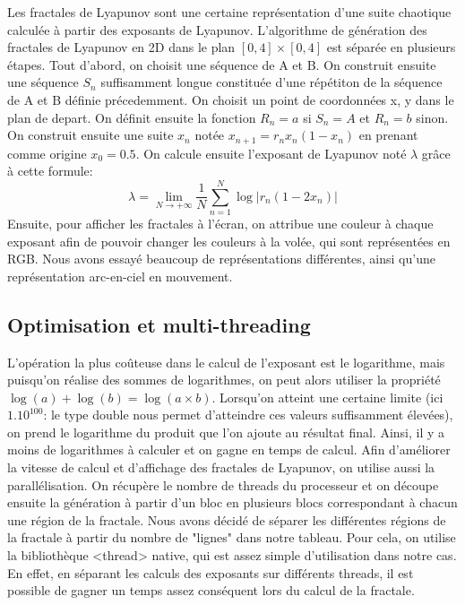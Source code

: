 \documentclass{article}
\begin{document}
	Les fractales de Lyapunov sont une certaine représentation d'une suite chaotique calculée à partir des exposants de Lyapunov.
	L'algorithme de génération des fractales de Lyapunov en 2D dans le plan $[0,4] \times [0,4]$ est séparée en plusieurs étapes.
	Tout d'abord, on choisit une séquence de A et B.
	On construit ensuite une séquence $S_n$ suffisamment longue constituée d'une répétiton de la séquence de A et B définie précedemment.
	On choisit un point de coordonnées x, y dans le plan de depart.
	On définit ensuite la fonction $R_n = a$ si $ S_n = A $ et $R_n = b$ sinon.
	On construit ensuite une suite $x_n$ notée $x_{{n+1}}=r_{n}x_{n}(1-x_{n})$ en prenant comme origine $x_0 = 0.5$.
	On calcule ensuite l'exposant de Lyapunov noté $\lambda$ grâce à cette formule:
	\[\lambda = \lim_{N \to +\infty} \frac{1}{N} \sum_{n=1}^{N} \log | r_n(1-2x_n) |\]
	Ensuite, pour afficher les fractales à l'écran, on attribue une couleur à chaque exposant afin de pouvoir changer les couleurs à la volée, qui sont représentées en RGB.
	Nous avons essayé beaucoup de représentations différentes, ainsi qu'une représentation arc-en-ciel en mouvement.

	\subsection{Optimisation et multi-threading}

	L'opération la plus coûteuse dans le calcul de l'exposant est le logarithme, mais puisqu'on réalise des sommes de logarithmes, on peut alors utiliser la propriété $\log(a) + \log(b) = \log(a \times b)$.
	Lorsqu'on atteint une certaine limite (ici $1.10^{100}$: le type double nous permet d'atteindre ces valeurs suffisamment élevées), on prend le logarithme du produit que l'on ajoute au résultat final.
	Ainsi, il y a moins de logarithmes à calculer et on gagne en temps de calcul.
	Afin d'améliorer la vitesse de calcul et d'affichage des fractales de Lyapunov, on utilise aussi la parallélisation.
	On récupère le nombre de threads du processeur et on découpe ensuite la génération à partir d'un bloc en plusieurs blocs correspondant à chacun une région de la fractale.
	Nous avons décidé de séparer les différentes régions de la fractale à partir du nombre de "lignes" dans notre tableau.
	Pour cela, on utilise la bibliothèque <thread> native, qui est assez simple d'utilisation dans notre cas.
	En effet, en séparant les calculs des exposants sur différents threads, il est possible de gagner un temps assez conséquent lors du calcul de la fractale.
\end{document}
